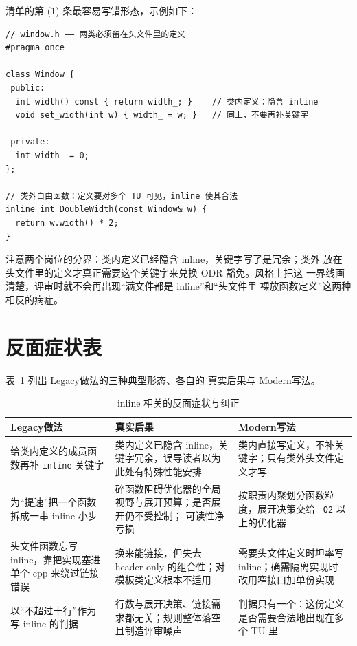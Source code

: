 \documentclass[12pt,a4paper,fontset=fandol]{ctexbook}
\newcommand{\Tp}[1]{\texttt{#1}}
\newcommand{\Lang}[1]{\textsf{#1}}
\newcommand{\DomMod}{\Lang{Modern}}
\newcommand{\DomTra}{\Lang{Legacy}}
\begin{document}
清单的第 (1) 条最容易写错形态，示例如下：

\begin{lstlisting}[style=cppstyle]
// window.h —— 两类必须留在头文件里的定义
#pragma once

class Window {
 public:
  int width() const { return width_; }    // 类内定义：隐含 inline
  void set_width(int w) { width_ = w; }   // 同上，不要再补关键字

 private:
  int width_ = 0;
};

// 类外自由函数：定义要对多个 TU 可见，inline 使其合法
inline int DoubleWidth(const Window& w) {
  return w.width() * 2;
}
\end{lstlisting}

注意两个岗位的分界：类内定义已经隐含 inline，关键字写了是冗余；类外
放在头文件里的定义才真正需要这个关键字来兑换 ODR 豁免。风格上把这
一界线画清楚，评审时就不会再出现``满文件都是 inline''和``头文件里
裸放函数定义''这两种相反的病症。

\section{反面症状表}
\label{sec:ch08-symptoms}

表~\ref{tab:ch08-symptoms} 列出 \DomTra 做法的三种典型形态、各自的
真实后果与 \DomMod 写法。

\begin{table}[htbp]
\centering
\begin{tabularx}{\textwidth}{
  >{\raggedright\arraybackslash}p{}
  >{\raggedright\arraybackslash}p{}
  >{\raggedright\arraybackslash}X}
\caption{inline 相关的反面症状与纠正}\label{tab:ch08-symptoms}\\
\toprule
\DomTra 做法 & 真实后果 & \DomMod 写法 \\
\midrule
给类内定义的成员函数再补 \Tp{inline} 关键字 &
类内定义已隐含 inline，关键字冗余，误导读者以为此处有特殊性能安排 &
类内直接写定义，不补关键字；只有类外头文件定义才写 \\
\addlinespace
为``提速''把一个函数拆成一串 inline 小步 &
碎函数阻碍优化器的全局视野与展开预算；是否展开仍不受控制；
可读性净亏损 &
按职责内聚划分函数粒度，展开决策交给 \Tp{-O2} 以上的优化器 \\
\addlinespace
头文件函数忘写 inline，靠把实现塞进单个 cpp 来绕过链接错误 &
换来能链接，但失去 header-only 的组合性；对模板类定义根本不适用 &
需要头文件定义时坦率写 inline；确需隔离实现时改用窄接口加单份实现 \\
\addlinespace
以``不超过十行''作为写 inline 的判据 &
行数与展开决策、链接需求都无关；规则整体落空且制造评审噪声 &
判据只有一个：这份定义是否需要合法地出现在多个 TU 里 \\
\bottomrule
\end{tabularx}
\end{table}
\end{document}
